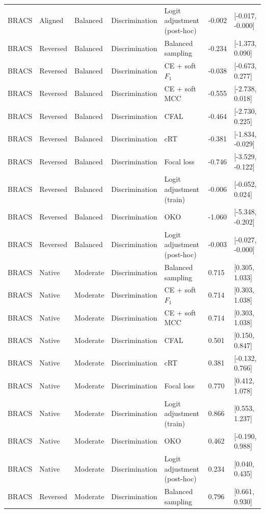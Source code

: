 \begin{longtable}{lllllll}
BRACS & Aligned & Balanced & Discrimination & Logit adjustment (post-hoc) & -0.002 & [-0.017, -0.000] \\
BRACS & Reversed & Balanced & Discrimination & Balanced sampling & -0.234 & [-1.373, 0.090] \\
BRACS & Reversed & Balanced & Discrimination & CE + soft $F_1$ & -0.038 & [-0.673, 0.277] \\
BRACS & Reversed & Balanced & Discrimination & CE + soft MCC & -0.555 & [-2.738, 0.018] \\
BRACS & Reversed & Balanced & Discrimination & CFAL & -0.464 & [-2.730, 0.225] \\
BRACS & Reversed & Balanced & Discrimination & cRT & -0.381 & [-1.834, -0.029] \\
BRACS & Reversed & Balanced & Discrimination & Focal loss & -0.746 & [-3.529, -0.122] \\
BRACS & Reversed & Balanced & Discrimination & Logit adjustment (train) & -0.006 & [-0.052, 0.024] \\
BRACS & Reversed & Balanced & Discrimination & OKO & -1.060 & [-5.348, -0.202] \\
BRACS & Reversed & Balanced & Discrimination & Logit adjustment (post-hoc) & -0.003 & [-0.027, -0.000] \\
BRACS & Native & Moderate & Discrimination & Balanced sampling & 0.715 & [0.305, 1.033] \\
BRACS & Native & Moderate & Discrimination & CE + soft $F_1$ & 0.714 & [0.303, 1.038] \\
BRACS & Native & Moderate & Discrimination & CE + soft MCC & 0.714 & [0.303, 1.038] \\
BRACS & Native & Moderate & Discrimination & CFAL & 0.501 & [0.150, 0.847] \\
BRACS & Native & Moderate & Discrimination & cRT & 0.381 & [-0.132, 0.766] \\
BRACS & Native & Moderate & Discrimination & Focal loss & 0.770 & [0.412, 1.078] \\
BRACS & Native & Moderate & Discrimination & Logit adjustment (train) & 0.866 & [0.553, 1.237] \\
BRACS & Native & Moderate & Discrimination & OKO & 0.462 & [-0.190, 0.988] \\
BRACS & Native & Moderate & Discrimination & Logit adjustment (post-hoc) & 0.234 & [0.040, 0.435] \\
BRACS & Reversed & Moderate & Discrimination & Balanced sampling & 0.796 & [0.661, 0.930] \\

\end{longtable}
